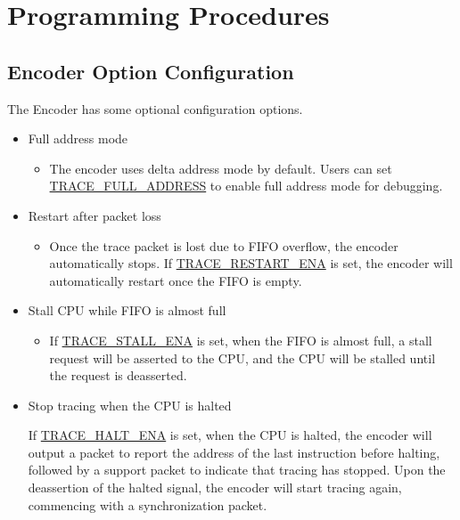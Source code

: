 \documentclass[main\_\_EN.tex]{subfiles}
\begin{document}

\section{Programming Procedures}
\label{sec:riscvtracenc-prog-procedures}

\subsection{Encoder Option Configuration}
The Encoder has some optional configuration options.
\begin{itemize}
    \item Full address mode
        \begin{itemize}
            \item The encoder uses delta address mode by default. Users can set \hyperref[fielddesc:TRACEFULLADDRESS]{TRACE\_FULL\_ADDRESS} to enable full address mode for debugging.
        \end{itemize}

        \item Restart after packet loss
            \begin{itemize}
                \item Once the trace packet is lost due to FIFO overflow, the encoder automatically stops. If \hyperref[fielddesc:TRACERESTARTENA]{TRACE\_RESTART\_ENA} is set, the encoder will automatically restart once the FIFO is empty.
            \end{itemize}

        \item Stall CPU while FIFO is almost full
            \begin{itemize}
                \item If \hyperref[fielddesc:TRACESTALLENA]{TRACE\_STALL\_ENA} is set, when the FIFO is almost full, a stall request will be asserted to the CPU, and the CPU will be stalled until the request is deasserted.
            \end{itemize}

        \item Stop tracing when the CPU is halted

            If \hyperref[fielddesc:TRACEHALTENA]{TRACE\_HALT\_ENA} is set, when the CPU is halted, the encoder will output a packet to report the address of the last instruction before halting, followed by a support packet to indicate that tracing has stopped. Upon the deassertion of the halted signal, the encoder will start tracing again, commencing with a synchronization packet.


\end{itemize}
\end{document}

